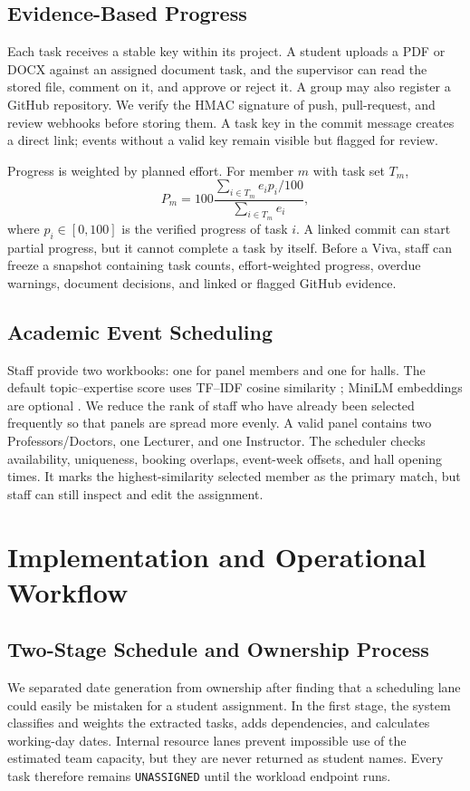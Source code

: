 \documentclass[conference]{IEEEtran}
\begin{document}
\subsection{Evidence-Based Progress}
Each task receives a stable key within its project. A student uploads a PDF or DOCX against an assigned document task, and the supervisor can read the stored file, comment on it, and approve or reject it. A group may also register a GitHub repository. We verify the HMAC signature of push, pull-request, and review webhooks before storing them. A task key in the commit message creates a direct link; events without a valid key remain visible but flagged for review.

Progress is weighted by planned effort. For member $m$ with task set $T_m$,
\begin{equation}
P_m=100\frac{\sum_{i\in T_m}e_i p_i/100}{\sum_{i\in T_m}e_i},
\end{equation}
where $p_i\in[0,100]$ is the verified progress of task $i$. A linked commit can start partial progress, but it cannot complete a task by itself. Before a Viva, staff can freeze a snapshot containing task counts, effort-weighted progress, overdue warnings, document decisions, and linked or flagged GitHub evidence.

\subsection{Academic Event Scheduling}
Staff provide two workbooks: one for panel members and one for halls. The default topic--expertise score uses TF--IDF cosine similarity \cite{salton1988tfidf}; MiniLM embeddings are optional \cite{wang2020minilm}. We reduce the rank of staff who have already been selected frequently so that panels are spread more evenly. A valid panel contains two Professors/Doctors, one Lecturer, and one Instructor. The scheduler checks availability, uniqueness, booking overlaps, event-week offsets, and hall opening times. It marks the highest-similarity selected member as the primary match, but staff can still inspect and edit the assignment.

\section{Implementation and Operational Workflow}

\subsection{Two-Stage Schedule and Ownership Process}
We separated date generation from ownership after finding that a scheduling lane could easily be mistaken for a student assignment. In the first stage, the system classifies and weights the extracted tasks, adds dependencies, and calculates working-day dates. Internal resource lanes prevent impossible use of the estimated team capacity, but they are never returned as student names. Every task therefore remains \texttt{UNASSIGNED} until the workload endpoint runs.
\end{document}
